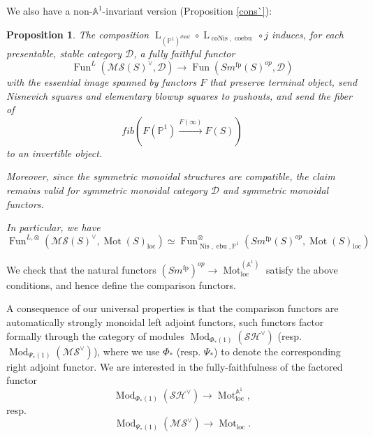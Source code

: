 \documentclass{article}
\newtheorem{prop}[thm]{Proposition}
\theoremstyle{definition}
\newcommand{\on}{\operatorname}
\begin{document}
We also have a non-$\mathbb{A}^1$-invariant version (Proposition \ref{cons`}):
\begin{prop}
The composition $\on{L}_{(\mathbb{P}^1)^{dual}}\circ\on{L}_{\on{coNis},\on{coebu}}\circ j$ induces, for each presentable, stable category $\mathcal{D}$, a fully faithful functor\[
\on{Fun}^L(\mathcal{MS}(S)^\vee,\mathcal{D})\rightarrow\on{Fun}(Sm^{\on{fp}}(S)^{op},\mathcal{D})
\]
with the essential image spanned by functors $F$ that preserve terminal object, send Nisnevich squares and elementary blowup squares to pushouts, and send the fiber of \[fib(F(\mathbb{P}^1)\xrightarrow{F(\infty)}F(S))\]
to an invertible object.


Moreover, since the symmetric monoidal structures are compatible, the claim remains valid for symmetric monoidal category $\mathcal{D}$ and symmetric monoidal functors.


In particular, we have\[\on{Fun}^{L,\otimes}(\mathcal{MS}(S)^\vee,\on{Mot}(S)_{\on{loc}})\simeq\on{Fun}^{\otimes}_{\on{Nis},\on{ebu},\mathbb{P}^1}(Sm^{\on{fp}}(S)^{op},\on{Mot}(S)_{\on{loc}})
\]
\end{prop}
We check that the natural functors $(Sm^{\on{fp}})^{op}\rightarrow\on{Mot}_{\on{loc}}^{(\mathbb{A}^1)}$ satisfy the above conditions, and hence define the comparison functors.


A consequence of our universal properties is that the comparison functors are automatically strongly monoidal left adjoint functors, such functors factor formally through the category of modules $\on{Mod}_{\Phi_\ast(1)}(\mathcal{SH}^\vee)$ (resp. $\on{Mod}_{\Psi_\ast(1)}(\mathcal{MS}^\vee)$), where we use $\Phi_\ast$ (resp. $\Psi_\ast$) to denote the corresponding right adjoint functor. We are interested in the fully-faithfulness of the factored functor\[\on{Mod}_{\Phi_\ast(1)}(\mathcal{SH}^\vee)\rightarrow\on{Mot}_{\on{loc}}^{\mathbb{A}^1},\]
resp.\[\on{Mod}_{\Psi_\ast(1)}(\mathcal{MS}^\vee)\rightarrow\on{Mot}_{\on{loc}}.\]
\end{document}
